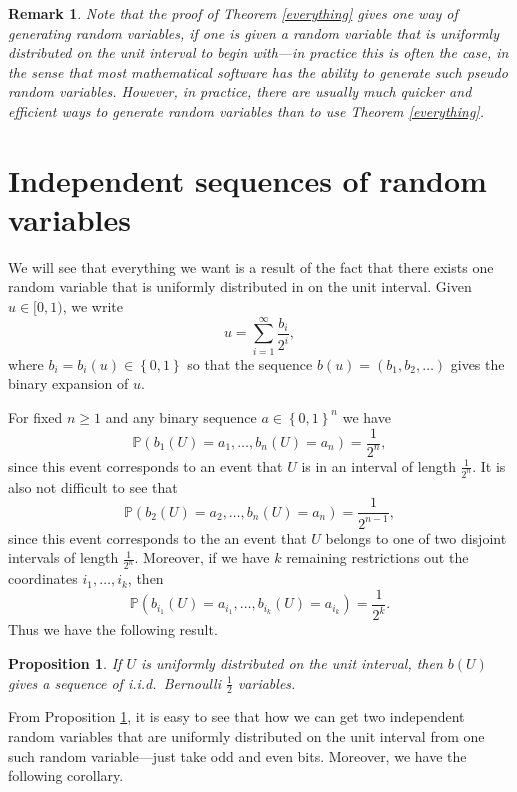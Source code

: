 \documentclass[12pt, reqno]{amsart}
\newtheorem{proposition}[theorem]{Proposition}
\newtheorem{remark}{Remark}
\newcommand\ns[1]{ \left\{ {#1} \right\} }
\renewcommand{\P}{{\mathbb P}}  %
\begin{document}
\begin{remark}
Note that the proof of Theorem \ref{everything} gives one way of generating random variables, if one is given a random variable that is uniformly distributed on the unit interval to begin with---in practice this is often the case, in the sense that most mathematical software has the ability to generate such  pseudo random variables.  However, in practice, there are usually much quicker and efficient ways to generate random variables than to use Theorem \ref{everything}. 
\end{remark}



\section{Independent sequences of random variables}


We will see that everything we want  is a result of the fact that there exists one random variable that is uniformly distributed in on the unit interval.  Given $u \in [0,1)$, we write $$u = \sum_{i=1} ^{\infty}  \frac{b_i}{2^{i}},$$
where $b_i = b_i(u) \in \ns{0,1}$ so that the sequence $b(u) = (b_1, b_2, \ldots)$ gives the binary expansion of $u$.  


For fixed $n \geq 1$ and any binary sequence $a \in \ns{0,1} ^n$ we have 
$$\P(b_1(U) = a_1, \ldots, b_n(U) = a_n) = \frac{1}{2^n},$$
since this event corresponds to an event that $U$ is in an interval of length $\tfrac{1}{2^n}.$  It is also not difficult to see that 
$$ \P(b_2(U) = a_2, \ldots, b_n(U) = a_n) = \frac{1}{2^{n-1}},$$
since this event corresponds to the an event that $U$ belongs to one of two disjoint intervals of length $\tfrac{1}{2^n}$.  Moreover, if we have $k$ remaining restrictions out the coordinates ${i_1, \ldots, i_k}$, then 
$$\P( b_{i_1}(U) = a_{i_1} , \ldots, b_{i_k}(U) = a_{i_k}) = \frac{1}{2^k}.$$  Thus we have the following result.

\begin{proposition}
\label{binaryexp}
If $U$ is uniformly distributed on the unit interval, then $b(U)$ gives a sequence of i.i.d.\ Bernoulli $\tfrac{1}{2}$ variables.  
\end{proposition}

From Proposition \ref{binaryexp}, it is easy to see that how we can get  two independent random variables that are uniformly distributed on the unit interval from one such random variable---just take odd and even bits.   Moreover, we have the following corollary.
\end{document}
